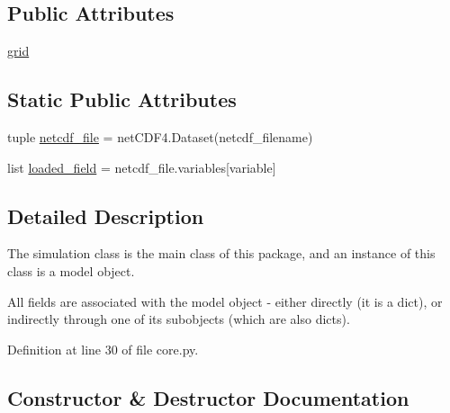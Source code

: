 \subsection*{Public Attributes}
\begin{DoxyCompactItemize}
\item 
\hyperlink{classmitgcm_1_1core_1_1MITgcm__Simulation_a984db65a189bf843e988079f724cdee3}{grid}
\end{DoxyCompactItemize}
\subsection*{Static Public Attributes}
\begin{DoxyCompactItemize}
\item 
tuple \hyperlink{classmitgcm_1_1core_1_1MITgcm__Simulation_a801f2b7847cdd50c031f6f566e263189}{netcdf\+\_\+file} = net\+C\+D\+F4.\+Dataset(netcdf\+\_\+filename)
\item 
list \hyperlink{classmitgcm_1_1core_1_1MITgcm__Simulation_ad50484938272dfc5107b0af495443d25}{loaded\+\_\+field} = netcdf\+\_\+file.\+variables\mbox{[}variable\mbox{]}
\end{DoxyCompactItemize}


\subsection{Detailed Description}
The simulation class is the main class of this package, and an instance of this class is a model object. 

All fields are associated with the model object -\/ either directly (it is a dict), or indirectly through one of its subobjects (which are also dicts). 

Definition at line 30 of file core.\+py.



\subsection{Constructor \& Destructor Documentation}
\hypertarget{classmitgcm_1_1core_1_1MITgcm__Simulation_aac012c75a0f5dce8bbc4b00422a12444}{}
